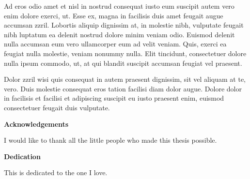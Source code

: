 Ad eros odio amet et nisl in nostrud consequat iusto eum suscipit autem vero enim dolore exerci, ut. Esse ex, magna in facilisis duis amet feugait augue accumsan zzril. Lobortis aliquip dignissim at, in molestie nibh, vulputate feugait nibh luptatum ea delenit nostrud dolore minim veniam odio. Euismod delenit nulla accumsan eum vero ullamcorper eum ad velit veniam. Quis, exerci ea feugiat nulla molestie, veniam nonummy nulla. Elit tincidunt, consectetuer dolore nulla ipsum commodo, ut, at qui blandit suscipit accumsan feugiat vel praesent.

Dolor zzril wisi quis consequat in autem praesent dignissim, sit vel aliquam at te, vero. Duis molestie consequat eros tation facilisi diam dolor augue. Dolore dolor in facilisis et facilisi et adipiscing suscipit eu iusto praesent enim, euismod consectetuer feugait duis vulputate.

\cleardoublepage
{}    %

\begin{center}\textbf{Acknowledgements}\end{center}

I would like to thank all the little people who made this thesis possible.
\cleardoublepage
{}    %

\begin{center}\textbf{Dedication}\end{center}

This is dedicated to the one I love.
\cleardoublepage
{}    %

\renewcommand\contentsname{Table of Contents}
\tableofcontents
\cleardoublepage
{}    %

\listoffigures
\cleardoublepage
{}		%

\listoftables
\cleardoublepage
{}		%

\renewcommand*{\abbreviationsname}{List of Abbreviations}
\printglossary[type=abbreviations]
\cleardoublepage
{}		%

\printglossary[type=symbols]
\cleardoublepage
{}		%



